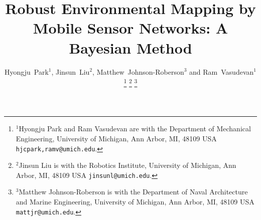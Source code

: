 \documentclass[letterpaper, 10 pt, conference]{ieeeconf}
\begin{document}
	
	

%
\title{\LARGE \bf
	 Robust Environmental Mapping by Mobile Sensor Networks: A Bayesian Method
}
%
%
%

\author{Hyongju~Park${}^1$, Jinsun~Liu${}^2$, Matthew~Johnson-Roberson${}^3$ and Ram~Vasudevan${}^1$
\thanks{${}^1$Hyongju Park and Ram Vasudevan are with the Department
	of Mechanical Engineering, University of Michigan, Ann Arbor,
	MI, 48109 USA {\tt\small hjcpark,ramv@umich.edu}.}%
\thanks{${}^2$Jinsun Liu is with the Robotics Institute, University of Michigan, Ann Arbor,
	MI, 48109 USA {\tt\small jinsunl@umich.edu}.}%
\thanks{${}^3$Matthew Johnson-Roberson is with the Department of Naval Architecture and Marine Engineering, University of Michigan, Ann Arbor,
	MI, 48109 USA {\tt\small mattjr@umich.edu}.}%
}%




\end{document}
